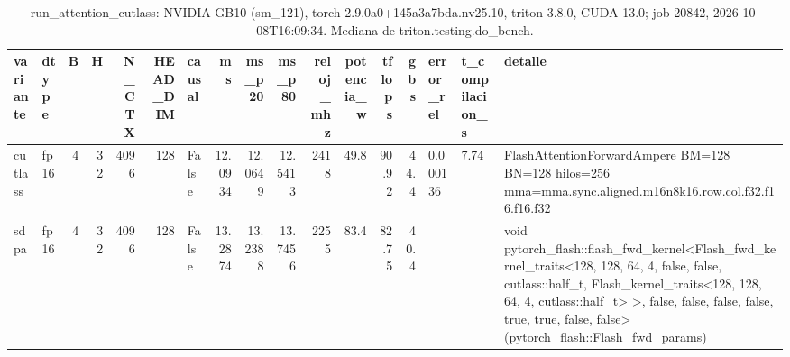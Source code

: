 \begin{table}[htbp]
  \centering\small
  \begin{tabular}{llrrrrlrrrrrrrlll}
    \toprule
    variante & dtype & B & H & N\_CTX & HEAD\_DIM & causal & ms & ms\_p20 & ms\_p80 & reloj\_mhz & potencia\_w & tflops & gbs & error\_rel & t\_compilacion\_s & detalle \\
    \midrule
    cutlass & fp16 & 4 & 32 & 4096 & 128 & False & 12.0934 & 12.0649 & 12.5413 & 2418 & 49.8 & 90.92 & 44.4 & 0.000136 & 7.74 & FlashAttentionForwardAmpere BM=128 BN=128 hilos=256 mma=mma.sync.aligned.m16n8k16.row.col.f32.f16.f16.f32 \\
    sdpa & fp16 & 4 & 32 & 4096 & 128 & False & 13.2874 & 13.2388 & 13.7456 & 2255 & 83.4 & 82.75 & 40.4 &  &  & void pytorch\_flash::flash\_fwd\_kernel<Flash\_fwd\_kernel\_traits<128, 128, 64, 4, false, false, cutlass::half\_t, Flash\_kernel\_traits<128, 128, 64, 4, cutlass::half\_t> >, false, false, false, false, true, true, false, false>(pytorch\_flash::Flash\_fwd\_params) \\
    \bottomrule
  \end{tabular}
  \caption{run\_attention\_cutlass: NVIDIA GB10 (sm\_121), torch 2.9.0a0+145a3a7bda.nv25.10, triton 3.8.0, CUDA 13.0; job 20842, 2026-10-08T16:09:34. Mediana de triton.testing.do\_bench.}
  \label{tab:hennessy-frio-run-attention-cutlass}
\end{table}
